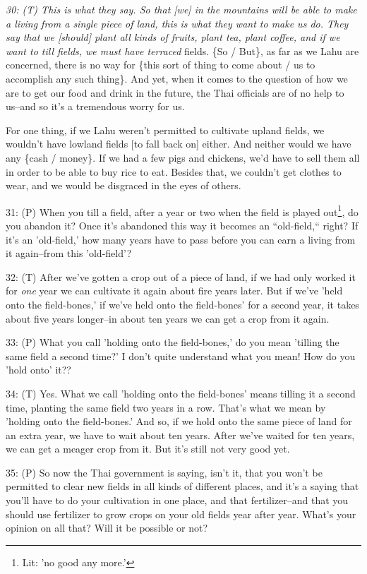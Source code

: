 \textit{30: (T) This is what they say. So that [we] in the mountains will be able
to make a living from a single piece of land, this is what they want to make us
do. They say that we [should] plant all kinds of fruits, plant tea, plant coffee,
and if we want to till fields, we must have terraced} fields. \{So / But\}, as
far as we Lahu are concerned, there is no way for \{this sort of thing to come
about / us to accomplish any such thing\}. And yet, when it comes to the question
of how we are to get our food and drink in the future, the Thai officials are of
no help to us--and so it's a tremendous worry for us.

For one thing, if we Lahu weren't permitted to cultivate upland fields, we wouldn't
have lowland fields [to fall back on] either. And neither would we have any \{cash
/ money\}. If we had a few pigs and chickens, we'd have to sell them all in order
to be able to buy rice to eat. Besides that, we couldn't get clothes to wear, and
we would be disgraced in the eyes of others.

31: (P) When you till a field, after a year or two when the field is played out\footnote{Lit: 'no good any more.'},
do you abandon it? Once it's abandoned this way it becomes an ``old-field,``
right? If it's an 'old-field,' how many years have to pass before you can earn
a living from it again--from this 'old-field'?

32: (T) After we've gotten a crop out of a piece of land, if we had only worked
it for \textit{one} year we can cultivate it again about fire years later. But
if we've 'held onto the field-bones,' if we've held onto the field-bones' for a
second year, it takes about five years longer--in about ten years we can get a
crop from it again.

33: (P) What you call 'holding onto the field-bones,' do you mean 'tilling the
same field a second time?' I don't quite understand what you mean! How do you 'hold
onto' it??

34: (T) Yes. What we call 'holding onto the field-bones' means tilling it a second
time, planting the same field two years in a row. That's what we mean by 'holding
onto the field-bones.' And so, if we hold onto the same piece of land for an extra
year, we have to wait about ten years. After we've waited for ten years, we can
get a meager crop from it. But it's still not very good yet.

35: (P) So now the Thai government is saying, isn't it, that you won't be permitted
to clear new fields in all kinds of different places, and it's a saying that you'll
have to do your cultivation in one place, and that fertilizer--and that you should
use fertilizer to grow crops on your old fields year after year. What's your opinion
on all that? Will it be possible or not?

